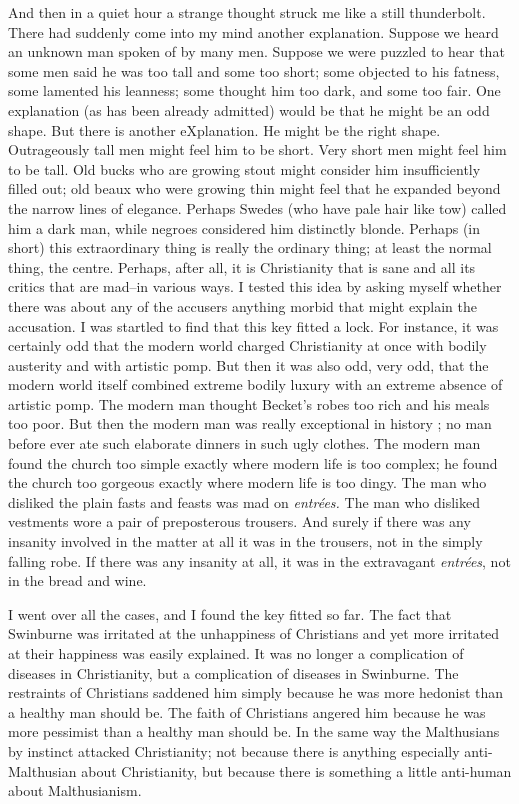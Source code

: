 \documentclass{book}
\begin{document}
And then in a quiet hour a strange thought struck me like a still thunderbolt. There had suddenly come into my mind another explanation. Suppose we heard an unknown man spoken of by many men. Suppose we were puzzled to hear that some men said he was too tall and some too short; some objected to his fatness, some lamented his leanness; some thought him too dark, and some too fair. One explanation (as has been already admitted) would be that he might be an odd shape. But there is another eXplanation. He might be the right shape. Outrageously tall men might feel him to be short. Very short men might feel him to be tall. Old bucks who are growing stout might consider him insufficiently filled out; old beaux who were growing thin might feel that he expanded beyond the narrow lines of elegance. Perhaps Swedes (who have pale hair like tow) called him a dark man, while negroes considered him distinctly blonde. Perhaps (in short) this extraordinary thing is really the ordinary thing; at least the normal thing, the centre. Perhaps, after all, it is Christianity that is sane and all its critics that are mad–in various ways. I tested this idea by asking myself whether there was about any of the accusers anything morbid that might explain the accusation. I was startled to find that this key fitted a lock. For instance, it was certainly odd that the modern world charged Christianity at once with bodily austerity and with artistic pomp. But then it was also odd, very odd, that the modern world itself combined extreme bodily luxury with an extreme absence of artistic pomp. The modern man thought Becket’s robes too rich and his meals too poor. But then the modern man was really exceptional in history ; no man before ever ate such elaborate dinners in such ugly clothes. The modern man found the church too simple exactly where modern life is too complex; he found the church too gorgeous exactly where modern life is too dingy. The man who disliked the plain fasts and feasts was mad on \emph{entrées.} The man who disliked vestments wore a pair of preposterous trousers. And surely if there was any insanity involved in the matter at all it was in the trousers, not in the simply falling robe. If there was any insanity at all, it was in the extravagant \emph{entrées}, not in the bread and wine.

I went over all the cases, and I found the key fitted so far. The fact that Swinburne was irritated at the unhappiness of Christians and yet more irritated at their happiness was easily explained. It was no longer a complication of diseases in Christianity, but a complication of diseases in Swinburne. The restraints of Christians saddened him simply because he was more hedonist than a healthy man should be. The faith of Christians angered him because he was more pessimist than a healthy man should be. In the same way the Malthusians by instinct attacked Christianity; not because there is anything especially anti-Malthusian about Christianity, but because there is something a little anti-human about Malthusianism.
\end{document}

